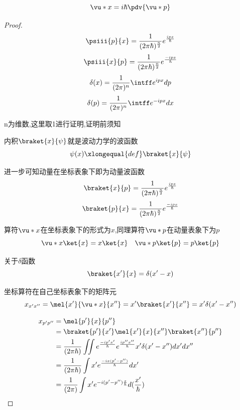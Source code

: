             \begin{formal}
                $$ \vu*{x} = i\hbar \pdv{\vu*{p}}$$

                \begin{proof}
                    \pfindent
    
                    $$ \psiii{p}{x} = \frac{1}{(2 \pi \hbar)^{\frac{n}{2}}} e^{\frac{ipx}{\hbar}} $$ 
                    $$ \psiii{x}{p} = \frac{1}{(2 \pi \hbar)^{\frac{n}{2}}} e^{\frac{-ipx}{\hbar}} $$ 
                    $$ \delta(x) = \frac{1}{(2\pi)^{n}} \intff e^{ipx} dp $$
                    $$ \delta(p) = \frac{1}{(2\pi)^{n}} \intff e^{-ipx} dx $$
    
                    n为维数,这里取1进行证明,证明前须知
                    
                    内积$\braket{x}{\psi}$就是波动力学的波函数
                    $$\psi (x) \xlongequal{def} \braket{x}{\psi}$$
                    
                    进一步可知动量在坐标表象下即为动量波函数
                    $$ \braket{x}{p} = \frac{1}{(2 \pi \hbar)^{\frac{n}{2}}} e^{\frac{ipx}{\hbar}} $$
                    $$ \braket{p}{x} = \frac{1}{(2 \pi \hbar)^{\frac{n}{2}}} e^{\frac{-ipx}{\hbar}} $$
    
                    算符$\vu*{x}$在坐标表象下的形式为$x$,同理算符$\vu*{p}$在动量表象下为$p$
                    $${\vu*{x}} \ket{x}= x \ket{x} \quad {\vu*{p}} \ket{p} = p \ket{p} $$
    
                    关于$\delta$函数
                    $$ \braket{x'}{x} = \delta(x'-x) $$
    
                    坐标算符在自己坐标表象下的矩阵元
                    $$ x_{x'x''} = \mel{x'}{\vu*{x}}{x''} = x' \braket{x'}{x''} = x' \delta(x'-x'') $$
    
                    \begin{align*}
                        x_{p'p''} &= \mel{p'}{x}{p''} \\
                                &= \braket{p'}{x'} \mel{x'}{x}{x''} \braket{x''}{p''}                                                                  \\
                                &= \frac{1}{(2 \pi \hbar)} \iint e^{\frac{-ip' x'}{\hbar}}  e^{\frac{ip''x''}{\hbar}} x' \delta(x'-x'') dx'dx''          \\
                                &= \frac{1}{(2 \pi \hbar)} \int x' e^{\frac{-ix(p'-p'')}{\hbar}}   dx'                                                   \\
                                &= \frac{1}{(2 \pi)} \int x' e^{-i(p'-p'')\frac{x}{\hbar}}   d(\frac{x'}{\hbar})
                    \end{align*}
    

\end{proof}
\end{formal}
